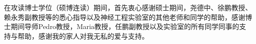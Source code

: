 
\thesisacknowledgement
在攻读博士学位（硕博连读）期间，首先衷心感谢硕士期间，尧德中、徐鹏教授、赖永秀副教授等的悉心指导以及神经工程实验室的其他老师和同学的帮助，感谢博士期间导师Pedro教授，Maria教授，任鹏副教授以及实验室的所有同学同事的支持与帮助，感谢我的家人对我无私的爱与支持。

